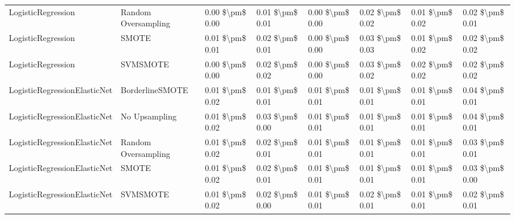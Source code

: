 \begin{tabular}{llllllll}
             LogisticRegression &           Random Oversampling & 0.00 \$\textbackslash pm\$ 0.00 &           0.01 \$\textbackslash pm\$ 0.01 &       0.00 \$\textbackslash pm\$ 0.00 &        0.02 \$\textbackslash pm\$ 0.02 &                         0.01 \$\textbackslash pm\$ 0.02 & 0.02 \$\textbackslash pm\$ 0.01 \\
             LogisticRegression &                         SMOTE & 0.01 \$\textbackslash pm\$ 0.01 &           0.02 \$\textbackslash pm\$ 0.01 &       0.00 \$\textbackslash pm\$ 0.00 &        0.03 \$\textbackslash pm\$ 0.03 &                         0.01 \$\textbackslash pm\$ 0.02 & 0.02 \$\textbackslash pm\$ 0.02 \\
             LogisticRegression &                      SVMSMOTE & 0.00 \$\textbackslash pm\$ 0.00 &           0.02 \$\textbackslash pm\$ 0.02 &       0.00 \$\textbackslash pm\$ 0.00 &        0.03 \$\textbackslash pm\$ 0.02 &                         0.02 \$\textbackslash pm\$ 0.02 & 0.02 \$\textbackslash pm\$ 0.02 \\
   LogisticRegressionElasticNet &               BorderlineSMOTE & 0.01 \$\textbackslash pm\$ 0.02 &           0.01 \$\textbackslash pm\$ 0.01 &       0.01 \$\textbackslash pm\$ 0.01 &        0.01 \$\textbackslash pm\$ 0.01 &                         0.01 \$\textbackslash pm\$ 0.01 & 0.04 \$\textbackslash pm\$ 0.01 \\
   LogisticRegressionElasticNet &                 No Upsampling & 0.01 \$\textbackslash pm\$ 0.02 &           0.03 \$\textbackslash pm\$ 0.00 &       0.01 \$\textbackslash pm\$ 0.01 &        0.01 \$\textbackslash pm\$ 0.01 &                         0.01 \$\textbackslash pm\$ 0.01 & 0.04 \$\textbackslash pm\$ 0.01 \\
   LogisticRegressionElasticNet &           Random Oversampling & 0.01 \$\textbackslash pm\$ 0.02 &           0.02 \$\textbackslash pm\$ 0.01 &       0.01 \$\textbackslash pm\$ 0.01 &        0.01 \$\textbackslash pm\$ 0.01 &                         0.01 \$\textbackslash pm\$ 0.01 & 0.03 \$\textbackslash pm\$ 0.01 \\
   LogisticRegressionElasticNet &                         SMOTE & 0.01 \$\textbackslash pm\$ 0.02 &           0.02 \$\textbackslash pm\$ 0.01 &       0.01 \$\textbackslash pm\$ 0.01 &        0.01 \$\textbackslash pm\$ 0.01 &                         0.01 \$\textbackslash pm\$ 0.01 & 0.03 \$\textbackslash pm\$ 0.00 \\
   LogisticRegressionElasticNet &                      SVMSMOTE & 0.01 \$\textbackslash pm\$ 0.02 &           0.02 \$\textbackslash pm\$ 0.00 &       0.01 \$\textbackslash pm\$ 0.01 &        0.02 \$\textbackslash pm\$ 0.01 &                         0.01 \$\textbackslash pm\$ 0.01 & 0.02 \$\textbackslash pm\$ 0.01 \\

\end{tabular}

